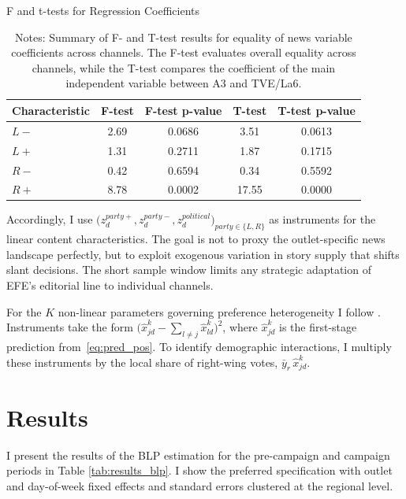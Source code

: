 \documentclass[12pt]{article}
\begin{document}
	
	
	
	\begin{table}[h!]
		\centering
	
		\label{tab:tests}
		\caption{F and t-tests for Regression Coefficients}
		\begin{tabular}{lcccc}
			\hline
			Characteristic & F-test  & F-test p-value & T-test  & T-test p-value \\
			\hline
			$ {L-}$& 2.69 & 0.0686 & 3.51  & 0.0613 \\
			$ {L+}$ & 1.31 & 0.2711 & 1.87  & 0.1715 \\
			$ {R-}$ & 0.42 & 0.6594 & 0.34 & 0.5592 \\
$ {R+}$ & 8.78 & 0.0002 & 17.55  & 0.0000 \\
			\hline
		\end{tabular}
			\caption*{\small Notes: Summary of F- and T-test results for equality of news variable coefficients across channels. The F-test evaluates overall equality across channels, while the T-test compares the coefficient of the main independent variable between A3 and TVE/La6.}
	\end{table}
	
	
	
	
	Accordingly, I use
	$\bigl(z_d^{party+},z_d^{party-},z_d^{political}\bigr)_{party\in\{L,R\}}$
	as instruments for the linear content characteristics.  The goal is not to proxy the outlet-specific news landscape perfectly, but to exploit exogenous variation in story supply that shifts slant decisions.  
	The short sample window limits any strategic adaptation of EFE’s editorial line to individual channels.
	
	For the $K$ non-linear parameters governing preference heterogeneity I follow \citet{gandhi2019measuring}.  
	Instruments take the form
	$\bigl(\hat{x}_{jd}^k-\sum_{l\neq j}\hat{x}_{ld}^k\bigr)^2$,
	where $\hat{x}_{jd}^k$ is the first-stage prediction from~\eqref{eq:pred_pos}.
	To identify demographic interactions, I multiply these instruments by the local share of right-wing votes, $\bar y_r\,\hat{x}_{jd}^k$.







	\section{Results}
	
	\label{section:results}
	
	I present the results of the BLP estimation for the pre-campaign and campaign periods in Table \ref{tab:results_blp}. I show the preferred specification with outlet and day-of-week fixed effects and standard errors clustered at the regional level.
	
\end{document}
